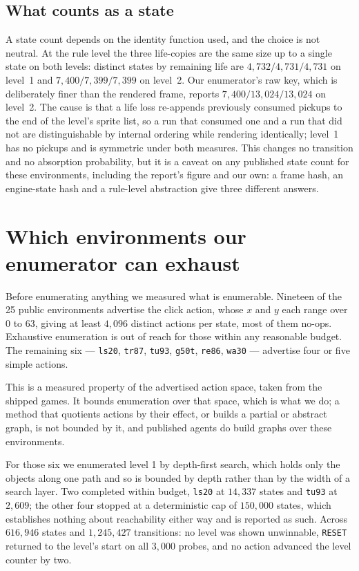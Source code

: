 \documentclass[11pt]{article}
\newcommand{\code}[1]{\texttt{#1}}
\begin{document}
\subsection{What counts as a state}
\label{sec:state}

A state count depends on the identity function used, and the choice is not
neutral. At the rule level the three life-copies are the same size up to a single
state on both levels: distinct states by remaining life are $4{,}732/4{,}731/4{,}731$ on level~1 and
$7{,}400/7{,}399/7{,}399$ on level~2. Our enumerator's raw key, which is deliberately
finer than the rendered frame, reports $7{,}400/13{,}024/13{,}024$ on level~2. The cause
is that a life loss re-appends previously consumed pickups to the end of the
level's sprite list, so a run that consumed one and a run that did not are
distinguishable by internal ordering while rendering identically; level~1 has no
pickups and is symmetric under both measures. This changes no transition and no
absorption probability, but it is a caveat on any published state count for
these environments, including the report's figure and our own: a frame hash, an
engine-state hash and a rule-level abstraction give three different answers.

\section{Which environments our enumerator can exhaust}
\label{sec:enumerable}
\label{sec:sweep}

Before enumerating anything we measured what is enumerable. Nineteen of the 25
public environments advertise the click action, whose $x$ and $y$ each range
over $0$ to $63$, giving at least $4{,}096$ distinct actions per state, most of them no-ops.
Exhaustive
enumeration is out of reach for those within any reasonable budget. The
remaining six --- \code{ls20}, \code{tr87}, \code{tu93}, \code{g50t},
\code{re86}, \code{wa30} --- advertise four or five simple actions.

This is a measured property of the advertised action space, taken from the
shipped games. It bounds enumeration over that space, which is what we do; a
method that quotients actions by their effect, or builds a partial or abstract
graph, is not bounded by it, and published agents do build graphs over these
environments.

For those six we enumerated level 1 by depth-first search, which holds only the
objects along one path and so is bounded by depth rather than by the width of a
search layer. Two completed within budget, \code{ls20} at $14{,}337$ states and
\code{tu93} at $2{,}609$; the other four stopped at a deterministic cap of
$150{,}000$ states, which establishes nothing about reachability either way and
is reported as such. Across $616{,}946$ states and $1{,}245{,}427$ transitions:
no level was shown unwinnable, \code{RESET} returned to the level's start on all
$3{,}000$ probes, and no action advanced the level counter by two.
\end{document}
